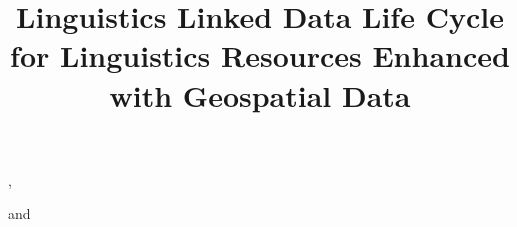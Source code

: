 \documentclass{iosart2c}
\begin{document}
\begin{frontmatter}                           %

\title{Linguistics Linked Data Life Cycle for Linguistics Resources Enhanced with Geospatial Data %
}




\author[A]{ %
},
\author[B,C]{ }
and
\author[D]{ }
\address[A]{Research Unit Quantitative Language Comparison, Ludwig Maximilian University, Geschwister Scholl Platz 1, D-80539 Munich, Germany\\ 
E-mail: bambooforest@gmail.com} %


\address[B]{Department of Intelligent Computer Systems, University of Malta, Msida, MSD2080, Malta}
\address[C]{Computational Linguistics Department, Saarland University, Saarbr\"ucken, 66121, Germany\\  E-mail: littauer@coli.uni-saarland.de}
\address[D]{Intelligent Software Components, iSOCO, S.A., Av. del Partenon 16-18, Madrid, Spain\\
E-mail: bvillazon@isoco.com}


\end{frontmatter}
\end{document}
